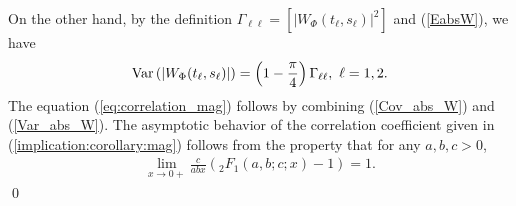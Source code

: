 \documentclass{amsart}
\begin{document}
On the other hand, by the definition $\Gamma_{\ell\ell}=[\left|W_{\Phi}(t_{\ell},s_{\ell})\right|^{2}]$ and
 (\ref{EabsW}), we have
\begin{align}\label{Var_abs_W}
\textup{Var}\left(\left|W_{\Phi}(t_{\ell},s_{\ell})\right|\right)
=\left(1-\frac{\pi}{4}\right)\Gamma_{\ell\ell},\
\ell=1,2.
\end{align}
The equation (\ref{eq:correlation_mag}) follows by combining (\ref{Cov_abs_W}) and (\ref{Var_abs_W}).
The asymptotic behavior of the correlation coefficient given in (\ref{implication:corollary:mag}) follows from the property that
for any $a,b,c>0$,
\begin{align*}%
\underset{x\rightarrow0+}{\lim} \frac{c}{abx}  \left({}_2F_1\left(a,b;c;x\right)-1\right)=1.
\end{align*}
\qed
\end{document}
